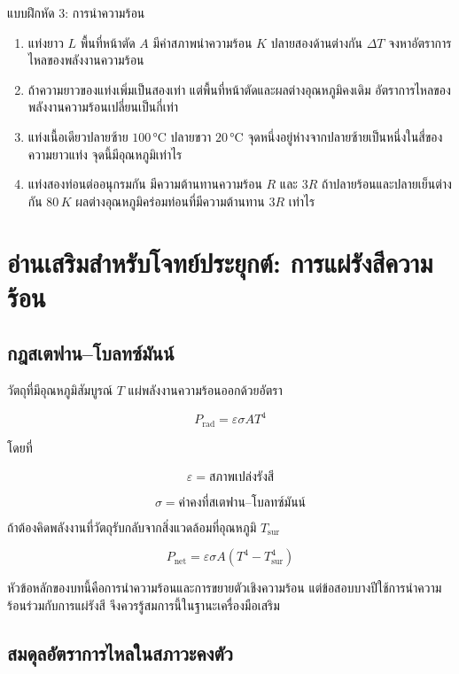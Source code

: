 \begin{exercisebox}{แบบฝึกหัด 3: การนำความร้อน}
\begin{enumerate}
    \item แท่งยาว $L$ พื้นที่หน้าตัด $A$ มีค่าสภาพนำความร้อน $K$ ปลายสองด้านต่างกัน $\Delta T$ จงหาอัตราการไหลของพลังงานความร้อน
    \item ถ้าความยาวของแท่งเพิ่มเป็นสองเท่า แต่พื้นที่หน้าตัดและผลต่างอุณหภูมิคงเดิม อัตราการไหลของพลังงานความร้อนเปลี่ยนเป็นกี่เท่า
    \item แท่งเนื้อเดียวปลายซ้าย $100\,\si{\degreeCelsius}$ ปลายขวา $20\,\si{\degreeCelsius}$ จุดหนึ่งอยู่ห่างจากปลายซ้ายเป็นหนึ่งในสี่ของความยาวแท่ง จุดนี้มีอุณหภูมิเท่าไร
    \item แท่งสองท่อนต่ออนุกรมกัน มีความต้านทานความร้อน $R$ และ $3R$ ถ้าปลายร้อนและปลายเย็นต่างกัน $80\,\si{K}$ ผลต่างอุณหภูมิคร่อมท่อนที่มีความต้านทาน $3R$ เท่าไร
\end{enumerate}
\end{exercisebox}

\section{อ่านเสริมสำหรับโจทย์ประยุกต์: การแผ่รังสีความร้อน}

\subsection{กฎสเตฟาน--โบลทซ์มันน์}

วัตถุที่มีอุณหภูมิสัมบูรณ์ $T$ แผ่พลังงานความร้อนออกด้วยอัตรา

\[
P_{\text{rad}}=\varepsilon\sigma AT^4
\]

โดยที่

\[
\varepsilon=\text{สภาพเปล่งรังสี}
\]

\[
\sigma=\text{ค่าคงที่สเตฟาน--โบลทซ์มันน์}
\]

ถ้าต้องคิดพลังงานที่วัตถุรับกลับจากสิ่งแวดล้อมที่อุณหภูมิ $T_{\text{sur}}$

\[
P_{\text{net}}
=
\varepsilon\sigma A
\left(T^4-T_{\text{sur}}^4\right)
\]

\begin{tcolorbox}[title=หมายเหตุเรื่องขอบเขต]
หัวข้อหลักของบทนี้คือการนำความร้อนและการขยายตัวเชิงความร้อน แต่ข้อสอบบางปีใช้การนำความร้อนร่วมกับการแผ่รังสี จึงควรรู้สมการนี้ในฐานะเครื่องมือเสริม
\end{tcolorbox}

\subsection{สมดุลอัตราการไหลในสภาวะคงตัว}

